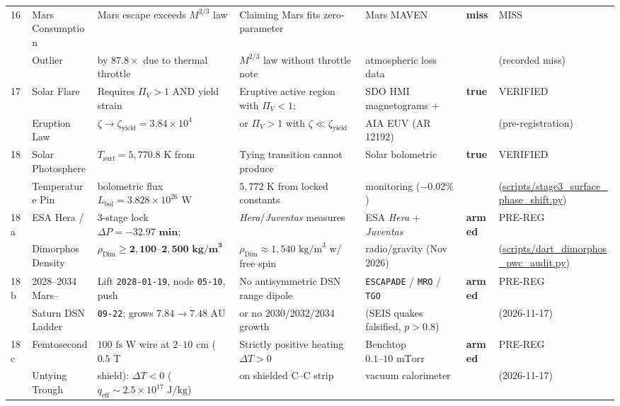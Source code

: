 \documentclass[11pt,a4paper]{article}
\begin{document}
\begin{table}[!htbp]
\begin{tabularx}{\textwidth}{C{0.45cm} L{2.0cm} Y L{2.65cm} L{2.72cm} C{1.2cm} L{2.18cm}}
16 & Mars Consumption & Mars escape exceeds $M^{2/3}$ law & Claiming Mars fits zero-parameter & Mars MAVEN & \textbf{miss} & MISS \\
& Outlier & by $87.8\times$ due to thermal throttle & $M^{2/3}$ law without throttle note & atmospheric loss data & & (recorded miss) \\
17 & Solar Flare & Requires $\Pi_V > 1$ AND yield strain & Eruptive active region with $\Pi_V < 1$; & SDO HMI magnetograms + & \textbf{true} & VERIFIED \\
& Eruption Law & $\zeta \to \zeta_{\text{yield}} = 3.84 \times 10^4$ & or $\Pi_V > 1$ with $\zeta \ll \zeta_{\text{yield}}$ & AIA EUV (AR 12192) & & (pre-registration) \\
18 & Solar Photosphere & $T_{\text{surf}} = 5,770.8\text{ K}$ from & Tying transition cannot produce & Solar bolometric & \textbf{true} & VERIFIED \\
& Temperature Pin & bolometric flux $L_{\text{bol}} = 3.828 \times 10^{26}\text{ W}$ & $5,772\text{ K}$ from locked constants & monitoring ($-0.02\%$) & & (\url{scripts/stage3_surface_phase_shift.py}) \\
18a & ESA Hera / & 3-stage lock $\Delta P = \mathbf{-32.97\text{ min}}$; & \textit{Hera}/\textit{Juventas} measures & ESA \textit{Hera} + \textit{Juventas} & \textbf{armed} & PRE-REG \\
& Dimorphos Density & $\rho_{\text{Dim}} \ge \mathbf{2{,}100\text{--}2{,}500\text{ kg/m}^3}$ & $\rho_{\text{Dim}} \approx 1{,}540\text{ kg/m}^3$ w/ free spin & radio/gravity (Nov 2026) & & (\url{scripts/dart_dimorphos_pwc_audit.py}) \\
18b & 2028--2034 Mars-- & Lift \texttt{2028-01-19}, node \texttt{05-10}, push & No antisymmetric DSN range dipole & \texttt{ESCAPADE} / \texttt{MRO} / \texttt{TGO} & \textbf{armed} & PRE-REG \\
& Saturn DSN Ladder & \texttt{09-22}; grows $7.84 \to 7.48\text{ AU}$ & or no 2030/2032/2034 growth & (SEIS quakes falsified, $p>0.8$) & & (2026-11-17) \\
18c & Femtosecond & $100\text{ fs}$ W wire at $2\text{--}10\text{ cm}$ ($0.5\text{ T}$ & Strictly positive heating $\Delta T > 0$ & Benchtop $0.1\text{--}10\text{ mTorr}$ & \textbf{armed} & PRE-REG \\
& Untying Trough & shield): $\Delta T < 0$ ($q_{\text{eff}} \sim 2.5 \times 10^{17}\text{ J/kg}$) & on shielded C--C strip & vacuum calorimeter & & (2026-11-17) \\
\bottomrule
\end{tabularx}
\end{table}
\end{document}
